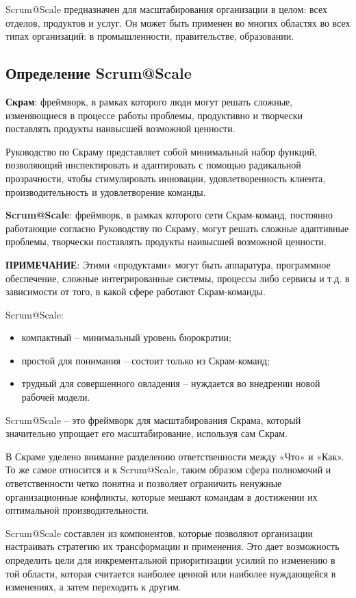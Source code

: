 \documentclass[12pt,a4paper,parskip=full]{scrartcl}
\begin{document}
Scrum@Scale предназначен для масштабирования организации в целом: всех отделов, продуктов и услуг. Он может быть применен во многих областях во всех типах организаций: в промышленности, правительстве, образовании.


\subsection{Определение Scrum@Scale}

\textbf{Скрам}: фреймворк, в рамках которого люди могут решать сложные, изменяющиеся в процессе работы проблемы, продуктивно и творчески поставлять продукты наивысшей возможной ценности.

Руководство по Скраму представляет собой минимальный набор функций,  позволяющий инспектировать и адаптировать с помощью радикальной прозрачности, чтобы стимулировать инновации, удовлетворенность клиента, производительность и удовлетворение команды. 


\textbf{Scrum@Scale}: фреймворк, в рамках которого сети Скрам-команд, постоянно работающие согласно Руководству по Скраму, могут решать сложные адаптивные проблемы, творчески поставлять продукты наивысшей возможной ценности.

\textbf{ПРИМЕЧАНИЕ}: Этими «продуктами» могут быть аппаратура, программное обеспечение, сложные интегрированные системы, процессы либо сервисы и т.д. в зависимости от того, в какой сфере работают Скрам-команды.

Scrum@Scale:
\begin{itemize}
	\item компактный – минимальный уровень бюрократии;
	\item простой для понимания – состоит только из Скрам-команд;
	\item трудный для совершенного овладения – нуждается во внедрении новой рабочей модели.
\end{itemize}

Scrum@Scale – это фреймворк для масштабирования Скрама, который значительно упрощает его масштабирование, используя сам Скрам.

В Скраме уделено внимание разделению ответственности между «Что» и «Как». То же самое относится и к Scrum@Scale, таким образом сфера полномочий и ответственности четко понятна и позволяет ограничить ненужные организационные конфликты, которые мешают командам в достижении их оптимальной производительности.

Scrum@Scale составлен из компонентов, которые позволяют организации настраивать стратегию их трансформации и применения. Это дает возможность определить цели для инкрементальной приоритизации усилий по изменению в той области, которая считается наиболее ценной или наиболее нуждающейся в изменениях, а затем переходить к другим.
\end{document}
